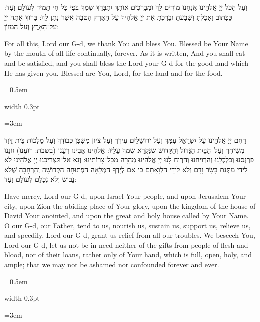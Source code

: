 \documentclass[11pt, openany]{book}
\newlength{\bidiHebWidth}
\newlength{\bidiEngWidth}
\newenvironment{bilingual}{%
  \par\vspace{4pt}%
}{%
  \noindent
  \begin{minipage}[t]{\bidiEngWidth}
    \setstretch{1.4}\emergencystretch=0.5em\normalsize
    \usebox{\bidiEngBox}
  \end{minipage}%
  \hfill
  {\color{sedergold}\vrule width 0.3pt}%
  \hfill
  \begin{minipage}[t]{\bidiHebWidth}
    \begingroup\hebrewfont\TeXXeTstate=1\beginR
    \large\setstretch{1.4}\emergencystretch=3em\tolerance=9999\parindent=0pt\relax
    \usebox{\bidiHebBox}
    \endR\endgroup
  \end{minipage}%
  \par\vspace{2pt}%
}
\newenvironment{hebrewcol}{%
  \begin{lrbox}{\bidiHebBox}\begin{minipage}{\bidiHebWidth}%
}{%
  \end{minipage}\end{lrbox}%
}
\newenvironment{englishcol}{%
  \begin{lrbox}{\bidiEngBox}\begin{minipage}{\bidiEngWidth}%
}{%
  \end{minipage}\end{lrbox}%
}
\begin{document}
\begin{bilingual}
\begin{hebrewcol}
וְעַל הַכֹּל יְיָ אֱלֹהֵינוּ אֲנַחְנוּ מוֹדִים לָךְ וּמְבָרְכִים אוֹתָךְ יִתְבָּרֵךְ שִׁמְךָ בְּפִי כָּל חַי תָּמִיד לְעוֹלָם וָעֶד: כַּכָּתוּב וְאָכַלְתָּ וְשָׂבָעְתָּ וּבֵרַכְתָּ אֶת יְיָ אֱלֹהֶיךָ עַל הָאָרֶץ הַטֹּבָה אֲשֶׁר נָתַן לָךְ: בָּרוּךְ אַתָּה יְיָ עַל־הָאָרֶץ וְעַל הַמָּזוֹן:
\end{hebrewcol}
\begin{englishcol}
For all this, Lord our G-d, we thank You and  bless You. Blessed be Your Name by the mouth of all life continually, forever. As it is written, And you shall eat and be satisfied, and you shall bless the Lord your G-d for the good land which He has given you. Blessed are You, Lord, for the land and for the food.
\end{englishcol}
\end{bilingual}
\begin{bilingual}
\begin{hebrewcol}
רַחֵם יְיָ אֱלֹהֵינוּ עַל יִשְׂרָאֵל עַמֶּךָ וְעַל יְרוּשָׁלַיִם עִירֶךָ וְעַל צִיּוֹן מִשְׁכַּן כְּבוֹדֶךָ וְעַל מַלְכוּת בֵּית דָּוִד מְשִׁיחֶךָ וְעַל–הַבַּיִת הַגָּדוֹל וְהַקָּדוֹשׁ שֶׁנִּקְרָא שִׁמְךָ עָלָיו: אֱלֹהֵינוּ אָבִינוּ רְעֵנוּ (בשבת: רוֹעֵנוּ) זוֹנֵנוּ פַּרְנְסֵנוּ וְכַלְכְּלֵנוּ וְהַרְוִיחֵנוּ וְהַרְוַח לָנוּ יְיָ אֱלֹהֵינוּ מְהֵרָה מִכָּל־צָרוֹתֵינוּ: וְנָא אַל־תַּצְרִיכֵנוּ יְיָ אֱלֹהֵינוּ לֹא לִידֵי מַתְּנַת בָּשָׂר וָדָם וְלֹא לִידֵי הַלְוָאָתָם כִּי אִם לְיָדְךָ הַמְּלֵאָה הַפְּתוּחָה הַקְּדוֹשָׁה וְהָרְחָבָה שֶׁלֹּא נֵבוֹשׁ וְלֹא נִכָּלֵם לְעוֹלָם וָעֶד:
\end{hebrewcol}
\begin{englishcol}
Have mercy, Lord our G-d, upon Israel Your people, and upon Jerusalem Your city, upon Zion the abiding place of Your glory, upon the kingdom of the house of David Your anointed, and upon the great and holy house called by Your Name. O our G-d, our Father, tend to us, nourish us, sustain us, support us, relieve us, and speedily, Lord our G-d, grant us relief from all our troubles. We beseech You, Lord our G-d, let us not be in need neither of the gifts from people of flesh and blood, nor of their loans, rather only of Your hand, which is full, open, holy, and ample; that we may not be ashamed nor confounded forever and ever.
\end{englishcol}
\end{bilingual}
\end{document}
